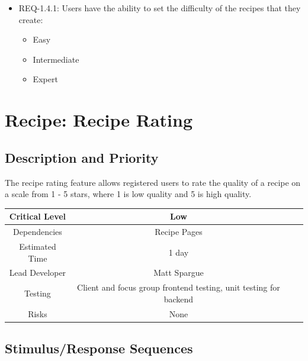 \documentclass{scrreprt}
\begin{document}
\begin{itemize}
    \item REQ-1.4.1: Users have the ability to set the difficulty of the recipes that they create:
        \begin{itemize}
            \item Easy
            \item Intermediate
            \item Expert
        \end{itemize}
\end{itemize}

\section{Recipe: Recipe Rating}

\subsection{Description and Priority}

The recipe rating feature allows registered users to rate the quality of a recipe on a scale from 1 - 5 stars, where 1 is low quality and 5 is high quality.

\begin{center}
    \begin{tabular}{| c | c | c | c |}
        \hline
        Critical Level & Low                                                               \\
        \hline
        Dependencies   & Recipe Pages                                                      \\
        \hline
        Estimated Time & 1 day                                                             \\
        \hline
        Lead Developer & Matt Spargue                                                    \\
        \hline
        Testing         & Client and focus group \gls{frontend} testing,
                          \gls{unit testing} for \gls{backend}                             \\
        \hline
        Risks          & None                                                              \\
        \hline
    \end{tabular}
\end{center}

\subsection{Stimulus/Response Sequences}
\end{document}
